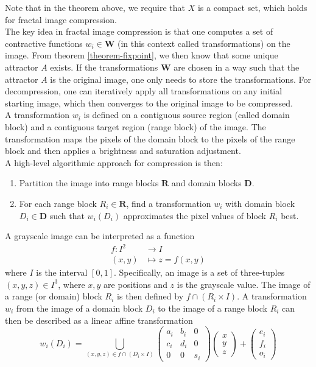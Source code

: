 Note that in the theorem above, we require that $X$ is a compact set, which holds for fractal image compression.
\\
The key idea in fractal image compression is that one computes a set of contractive functions $w_i \in \boldsymbol{W}$ (in this context called transformations) on the image.
From theorem \ref{theorem-fixpoint}, we then know that some unique attractor $A$ exists. If the transformations $\boldsymbol{W}$ are chosen in a way such that the attractor $A$ is the original image,
one only needs to store the transformations. For decompression, one can iteratively apply all transformations on any initial starting image, which then converges to the original image to be compressed.\\
A transformation $w_i$ is defined on a contiguous source region (called domain block) and a contiguous target region (range block) of the image. 
The transformation maps the pixels of the domain block to the pixels of the range block and then applies a brightness and saturation adjustment.\\
A high-level algorithmic approach for compression is then:
\begin{enumerate}
    \item Partition the image into range blocks $\boldsymbol{R}$ and domain blocks $\boldsymbol{D}$.
    \item For each range block $R_i \in \boldsymbol{R}$, find a transformation $w_i$ with domain block $D_i \in \boldsymbol{D}$ 
            such that $w_i(D_i)$ approximates the pixel values of block $R_i$ best.
\end{enumerate}
A grayscale image can be interpreted as a function
\begin{align*}
    f \colon I^2 &\to I\\
    (x,y) &\mapsto z = f(x,y)
\end{align*}
where $I$ is the interval $[0,1]$. Specifically, an image is a set of three-tuples $(x,y,z) \in I^3$, where $x,y$ are positions and $z$ is the grayscale value.
The image of a range (or domain) block $R_i$ is then defined by $f \cap (R_i \times I)$. 
A transformation $w_i$ from the image of a domain block $D_i$ to the image of a range block $R_i$ can then be described as a linear affine transformation
$$
w_i(D_i) = \bigcup_{(x,y,z) \in f \cap (D_i \times I)} \begin{pmatrix} a_i & b_i & 0 \\ c_i & d_i & 0 \\ 0 & 0 & s_i \end{pmatrix} \begin{pmatrix} x\\y\\z \end{pmatrix} + \begin{pmatrix} e_i\\f_i\\o_i \end{pmatrix}
$$
